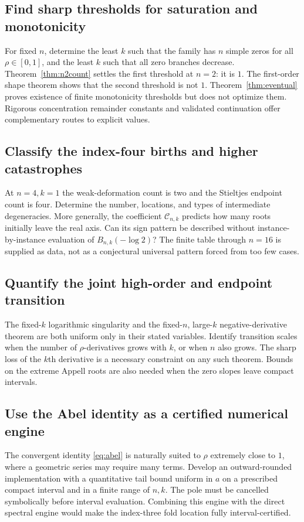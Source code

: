\documentclass[11pt,letterpaper]{article}
\numberwithin{equation}{section}
\theoremstyle{definition}\newtheorem{definition}[theorem]{Definition}
\theoremstyle{remark}\newtheorem{remark}[theorem]{Remark}
\begin{document}
\subsection{Find sharp thresholds for saturation and monotonicity}
For fixed $n$, determine the least $k$ such that the family has $n$ simple zeros for all $\rho\in[0,1]$, and the least $k$ such that all zero branches decrease. Theorem~\ref{thm:n2count} settles the first threshold at $n=2$: it is $1$. The first-order shape theorem shows that the second threshold is not $1$. Theorem~\ref{thm:eventual} proves existence of finite monotonicity thresholds but does not optimize them. Rigorous concentration remainder constants and validated continuation offer complementary routes to explicit values.

\subsection{Classify the index-four births and higher catastrophes}
At $n=4,k=1$ the weak-deformation count is two and the Stieltjes endpoint count is four. Determine the number, locations, and types of intermediate degeneracies. More generally, the coefficient $\mathcal C_{n,k}$ predicts how many roots initially leave the real axis. Can its sign pattern be described without instance-by-instance evaluation of $B_{n,k}(-\log2)$? The finite table through $n=16$ is supplied as data, not as a conjectural universal pattern forced from too few cases.

\subsection{Quantify the joint high-order and endpoint transition}
The fixed-$k$ logarithmic singularity and the fixed-$n$, large-$k$ negative-derivative theorem are both uniform only in their stated variables. Identify transition scales when the number of $\rho$-derivatives grows with $k$, or when $n$ also grows. The sharp loss of the $k$th derivative is a necessary constraint on any such theorem. Bounds on the extreme Appell roots are also needed when the zero slopes leave compact intervals.

\subsection{Use the Abel identity as a certified numerical engine}
The convergent identity \eqref{eq:abel} is naturally suited to $\rho$ extremely close to $1$, where a geometric series may require many terms. Develop an outward-rounded implementation with a quantitative tail bound uniform in $a$ on a prescribed compact interval and in a finite range of $n,k$. The pole must be cancelled symbolically before interval evaluation. Combining this engine with the direct spectral engine would make the index-three fold location fully interval-certified.
\end{document}
